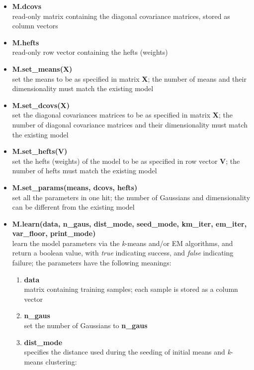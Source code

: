 \begin{small}
\begin{itemize}
\item
{\bf M.dcovs}\\
read-only matrix containing the diagonal covariance matrices, stored as column vectors

\item
{\bf M.hefts}\\
read-only row vector containing the hefts (weights)

\item
{\bf M.set\_means(X)}\\
set the means to be as specified in matrix {\bf X};
the number of means and their dimensionality must match the existing model

\item
{\bf M.set\_dcovs(X)}\\
set the diagonal covariances matrices to be as specified in matrix {\bf X};
the number of diagonal covariance matrices and their dimensionality must match the existing model

\item
{\bf M.set\_hefts(V)}\\
set the hefts (weights) of the model to be as specified in row vector {\bf V};
the number of hefts must match the existing model

\item
{\bf M.set\_params(means, dcovs, hefts)}\\
set all the parameters in one hit;
the number of Gaussians and dimensionality can be different from the existing model

\item
{\bf M.learn(data, n\_gaus, dist\_mode, seed\_mode, km\_iter, em\_iter, var\_floor, print\_mode)}\\
learn the model parameters via the {\it k}-means and/or EM algorithms,
and return a boolean value, with {\it true} indicating success, and {\it false} indicating failure;
the parameters have the following meanings:

\begin{enumerate}[{$\cdot$}]
\item
{\bf data}\\
matrix containing training samples; each sample is stored as a column vector

\item
{\bf n\_gaus}\\
set the number of Gaussians to {\bf n\_gaus}

\item
{\bf dist\_mode}\\
specifies the distance used during the seeding of initial means and {\it k}-means clustering:


\end{enumerate}
\end{itemize}
\end{small}
